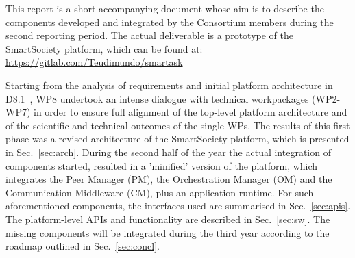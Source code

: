 This report is a short accompanying document whose aim is to describe the components developed and integrated by the Consortium members during the second reporting period. The actual deliverable is a prototype of the SmartSociety platform, which can be found at:
\url{https://gitlab.com/Teudimundo/smartask}

Starting from the analysis of requirements and initial platform architecture in D8.1~\cite{D8.1}, WP8 undertook an intense dialogue with technical workpackages (WP2-WP7) in order to ensure full alignment of the top-level platform architecture and of the scientific and technical outcomes of the single WPs. The results of this first phase was a revised architecture of the SmartSociety platform, which is presented in Sec.~\ref{sec:arch}. During the second half of the year the actual integration of components started, resulted in a 'minified' version of the platform, which integrates the Peer Manager (PM), the Orchestration Manager (OM) and the Communication Middleware (CM), plus an application runtime. For such aforementioned components, the interfaces used are summarised in Sec.~\ref{sec:apis}. The platform-level APIs and functionality are described in Sec.~\ref{sec:sw}. The missing components will be integrated during the third year according to the roadmap outlined in Sec.~\ref{sec:concl}.




